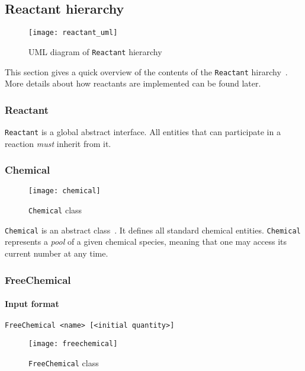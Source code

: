 
\subsection{Reactant hierarchy}

\begin{figure}[!h]
  \centering
  \texttt{[image: reactant\_uml]}
  \caption{UML diagram of \texttt{Reactant} hierarchy}
  \label{fig:reactant_uml}
\end{figure}

This section gives a quick overview of the contents of the \texttt{Reactant} hirarchy~. More details about how reactants are implemented can be found later.

\subsubsection{Reactant}

\texttt{Reactant} is a global abstract interface. All entities that can participate in a reaction \emph{must} inherit from it.

\subsubsection{Chemical}

\begin{figure}[!h]
  \centering
  \texttt{[image: chemical]}
  \caption{\texttt{Chemical} class}
  \label{fig:chemical}
\end{figure}

\texttt{Chemical} is an abstract class~. It defines all standard chemical entities. \texttt{Chemical} represents a \emph{pool} of a given chemical species, meaning that one may access its current number at any time.

\subsubsection{FreeChemical}

\paragraph{Input format}
\begin{verbatim}
FreeChemical <name> [<initial quantity>]
\end{verbatim}

\begin{figure}[!h]
  \centering
  \texttt{[image: freechemical]}
  \caption{\texttt{FreeChemical} class}
  \label{fig:free_chemical}
\end{figure}


